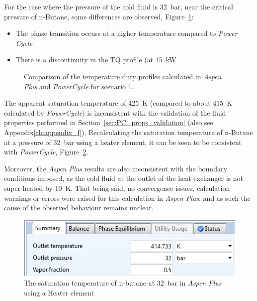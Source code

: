             For the case where the pressure of the cold fluid is \qty{32}{\bar}, near the critical pressure of n-Butane, some differences are observed, Figure~\ref{fig:Aspen_HX_validation_plot}: 
            \begin{itemize}
                \item The phase transition occurs at a higher temperature compared to \emph{Power Cycle}
                \item There is a discontinuity in the TQ profile (at \qty{45}{\kilo\watt}
            \end{itemize}

            \begin{figure}[H]
                \centering
                
                \caption{Comparison of the temperature duty profiles calculated in \emph{Aspen Plus} and \emph{PowerCycle} for scenario 1.}
                \label{fig:Aspen_HX_validation_plot}
            \end{figure}

            The apparent saturation temperature of \qty{425}{\K} (compared to about \qty{415}{\K} calculated by \emph{PowerCycle}) is inconsistent with the validation of the fluid properties performed in Section~\ref{sec:PC_props_validation} (also see Appendix\ref{ch:appendix_f}). Recalculating the saturation temperature of n-Butane at a pressure of \qty{32}{\bar} using a heater element, it can be seen to be consistent with \emph{PowerCycle}, Figure~\ref{fig:Aspen_HX_Tsat}.
    
            Moreover, the \emph{Aspen Plus} results are also inconsistent with the boundary conditions imposed, as the cold fluid at the outlet of the heat exchanger is not super-heated by \qty{10}{\K}. That being said, no convergence issues, calculation warnings or errors were raised for this calculation in \emph{Aspen Plus}, and as such the cause of the observed behaviour remains unclear. 
    
            \begin{figure}[H]
                \centering
                \includegraphics{Content/PowerCycle/Figures/AspenPlus_HX_Tsat.png}
                \caption{The saturation temperature of n-butane at \qty{32}{\bar} in \emph{Aspen Plus} using a Heater element}
                \label{fig:Aspen_HX_Tsat}
            \end{figure}
    
